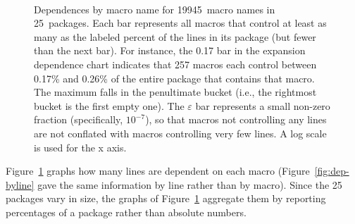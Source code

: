 \documentclass[10pt]{article}
\def\numdependpackages{25}
\def\numdependmacronames{19945}
\newcommand{\captionsmall}[1]{\caption[]{\small #1}}
\begin{document}
\begin{figure}
\centerline{%
\ %
}
\captionsmall{Dependences by macro name for \numdependmacronames\ macro
  names in \numdependpackages\ packages.  Each bar represents all macros
  that control at least as many as the labeled percent of the lines in its
  package (but fewer than the next bar).  For instance, the 0.17 bar in the
  expansion dependence chart indicates that 257 macros each control between
  0.17\% and 0.26\% of the entire package that contains that macro.  The
  maximum falls in the penultimate bucket (i.e., the rightmost bucket is
  the first empty one).  The $\varepsilon$ bar represents a small non-zero
  fraction (specifically, $10^{-7}$), so that macros not controlling any lines
  are not conflated with macros controlling very few lines.  A log scale is
  used for the x axis.}

\label{fig:dep-bymacro}
\end{figure}

Figure~\ref{fig:dep-bymacro} graphs how many lines are dependent on each
macro (Figure~\ref{fig:dep-byline} gave the same information by line rather
than by macro).  Since the {\numdependpackages} packages vary in size, the
graphs of Figure~\ref{fig:dep-bymacro} aggregate them by reporting
percentages of a package rather than absolute numbers.



\end{document}
